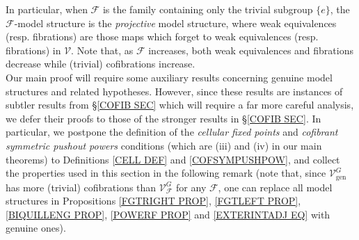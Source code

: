 \documentclass[a4paper,10pt
,draft
]{article}%
\numberwithin{equation}{section}
\numberwithin{figure}{section}
\theoremstyle{definition} %
\newtheorem{remark}[equation]{Remark}%
\newcommand{\F}{\ensuremath{\mathcal F}}
\newcommand{\V}{\ensuremath{\mathcal V}}
\newcommand{\1}{\ensuremath{\mathbbm 1}}%
\begin{document}
In particular, when $\F$ 
is the family containing only the trivial subgroup $\{e\}$,
the $\F$-model structure is the \textit{projective} model structure, where weak equivalences (resp. fibrations) are those maps which forget to weak equivalences (resp. fibrations) in $\V$.
Note that, as $\F$ increases, 
both weak equivalences and fibrations decrease while
(trivial) cofibrations increase.\\

Our main proof will require some auxiliary results concerning genuine model structures and related hypotheses.
However, since these results are 
instances of subtler results from \S \ref{COFIB SEC}
which will require a far more careful analysis,
we defer their %
proofs to those
of the stronger results in \S \ref{COFIB SEC}.
%
In particular, 
we postpone the definition of the
\emph{cellular fixed points}
and
\emph{cofibrant symmetric pushout powers}
conditions
(which are (iii) and (iv) in our main theorems)
to Definitions \ref{CELL DEF} and \ref{COFSYMPUSHPOW},
and collect the properties used in this section
in the following remark
%
(note that, since $\V^G_{\text{gen}}$
has more (trivial) cofibrations than 
$\V^G_{\mathcal{F}}$ for any $\F$,
one can replace all model structures in
Propositions \ref{FGTRIGHT PROP},
\ref{FGTLEFT PROP}, 
\ref{BIQUILLENG PROP}, 
\ref{POWERF PROP}
and \eqref{EXTERINTADJ EQ} with genuine ones).



\end{document}
